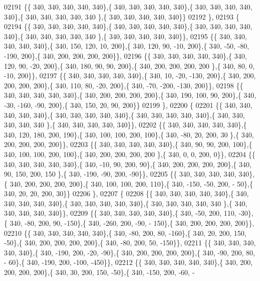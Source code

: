\begin{DoxyCode}
02191 \{\{ 340, 340, 340, 340, 340\},\{ 340, 340, 340, 340, 340\},\{ 340, 340, 340, 340, 340\},\{ 340, 340, 340, 340, 340
      \},\{ 340, 340, 340, 340, 340\}\}
02192 \},
02193 \{
02194 \{\{ 340, 340, 340, 340, 340\},\{ 340, 340, 340, 340, 340\},\{ 340, 340, 340, 340, 340\},\{ 340, 340, 340, 340, 340
      \},\{ 340, 340, 340, 340, 340\}\},
02195 \{\{ 340, 340, 340, 340, 340\},\{ 340, 150, 120,  10, 200\},\{ 340, 120,  90, -10, 200\},\{ 340, -50, -80, -190, 
      200\},\{ 340, 200, 200, 200, 200\}\},
02196 \{\{ 340, 340, 340, 340, 340\},\{ 340, 120,  90, -20, 200\},\{ 340, 180,  90,  90, 200\},\{ 340, 200, 200, 200, 200
      \},\{ 340,  80,   0, -10, 200\}\},
02197 \{\{ 340, 340, 340, 340, 340\},\{ 340,  10, -20, -130, 200\},\{ 340, 200, 200, 200, 200\},\{ 340, 110,  80, -20, 
      200\},\{ 340, -70, -200, -130, 200\}\},
02198 \{\{ 340, 340, 340, 340, 340\},\{ 340, 200, 200, 200, 200\},\{ 340, 190, 100,  90, 200\},\{ 340, -30, -160, -90, 
      200\},\{ 340, 150,  20,  90, 200\}\}
02199 \},
02200 \{
02201 \{\{ 340, 340, 340, 340, 340\},\{ 340, 340, 340, 340, 340\},\{ 340, 340, 340, 340, 340\},\{ 340, 340, 340, 340, 340
      \},\{ 340, 340, 340, 340, 340\}\},
02202 \{\{ 340, 340, 340, 340, 340\},\{ 340, 120, 180, 200, 190\},\{ 340, 100, 100, 200, 100\},\{ 340, -80,  20, 200,  30
      \},\{ 340, 200, 200, 200, 200\}\},
02203 \{\{ 340, 340, 340, 340, 340\},\{ 340,  90,  90, 200, 100\},\{ 340, 100, 100, 200, 100\},\{ 340, 200, 200, 200, 200
      \},\{ 340,   0,   0, 200,   0\}\},
02204 \{\{ 340, 340, 340, 340, 340\},\{ 340, -10,  90, 200,  90\},\{ 340, 200, 200, 200, 200\},\{ 340,  90, 150, 200, 150
      \},\{ 340, -190, -90, 200, -90\}\},
02205 \{\{ 340, 340, 340, 340, 340\},\{ 340, 200, 200, 200, 200\},\{ 340, 100, 100, 200, 110\},\{ 340, -150, -50, 200, -
      50\},\{ 340,  20,  20, 200,  30\}\}
02206 \},
02207 \{
02208 \{\{ 340, 340, 340, 340, 340\},\{ 340, 340, 340, 340, 340\},\{ 340, 340, 340, 340, 340\},\{ 340, 340, 340, 340, 340
      \},\{ 340, 340, 340, 340, 340\}\},
02209 \{\{ 340, 340, 340, 340, 340\},\{ 340, -50, 200, 110, -30\},\{ 340, -80, 200,  90, -150\},\{ 340, -260, 200, -90, -
      150\},\{ 340, 200, 200, 200, 200\}\},
02210 \{\{ 340, 340, 340, 340, 340\},\{ 340, -80, 200,  80, -160\},\{ 340,  20, 200, 150, -50\},\{ 340, 200, 200, 200, 
      200\},\{ 340, -80, 200,  50, -150\}\},
02211 \{\{ 340, 340, 340, 340, 340\},\{ 340, -190, 200, -20, -90\},\{ 340, 200, 200, 200, 200\},\{ 340, -90, 200,  80, -
      60\},\{ 340, -190, 200, -100, -450\}\},
02212 \{\{ 340, 340, 340, 340, 340\},\{ 340, 200, 200, 200, 200\},\{ 340,  30, 200, 150, -50\},\{ 340, -150, 200, -60, -

\end{DoxyCode}
